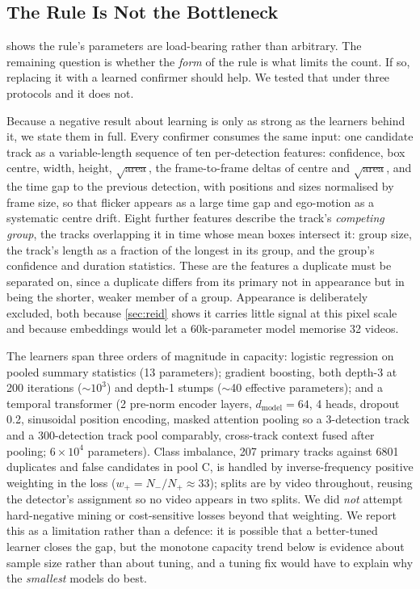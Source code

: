 \subsection{The Rule Is Not the Bottleneck}
\label{sec:learned}

 shows the rule's parameters are load-bearing rather than arbitrary.
The remaining question is whether the \emph{form} of the rule is what limits the count. If
so, replacing it with a learned confirmer should help. We tested that under three protocols
and it does not.

Because a negative result about learning is only as strong as the learners behind it, we
state them in full. Every confirmer consumes the same input: one candidate track as a
variable-length sequence of ten per-detection features: confidence, box centre, width, height, $\sqrt{\text{area}}$, the frame-to-frame deltas of centre and $\sqrt{\text{area}}$,
and the time gap to the previous detection, with positions and sizes normalised by frame
size, so that flicker appears as a large time gap and ego-motion as a systematic centre
drift. Eight further features describe the track's \emph{competing group}, the tracks
overlapping it in time whose mean boxes intersect it: group size, the track's length as a
fraction of the longest in its group, and the group's confidence and duration statistics.
These are the features a duplicate must be separated on, since a duplicate differs from its
primary not in appearance but in being the shorter, weaker member of a group. Appearance is
deliberately excluded, both because \cref{sec:reid} shows it carries little signal at this
pixel scale and because embeddings would let a 60k-parameter model memorise 32 videos.

The learners span three orders of magnitude in capacity: logistic regression on pooled
summary statistics (13 parameters); gradient boosting, both depth-3 at 200 iterations
($\sim$$10^3$) and depth-1 stumps ($\sim$40 effective parameters); and a temporal transformer
(2 pre-norm encoder layers, $d_{\text{model}}=64$, 4 heads, dropout 0.2, sinusoidal position
encoding, masked attention pooling so a 3-detection track and a 300-detection track pool
comparably, cross-track context fused after pooling; $6\times10^4$ parameters). Class
imbalance, 207 primary tracks against 6801 duplicates and false candidates in pool C, is
handled by inverse-frequency positive weighting in the loss
($w_+=N_-/N_+\approx33$); splits are by video throughout, reusing the detector's assignment so
no video appears in two splits. We did \emph{not} attempt hard-negative mining or
cost-sensitive losses beyond that weighting. We report this as a limitation rather than a
defence: it is possible that a better-tuned learner closes the gap, but the monotone capacity
trend below is evidence about sample size rather than about tuning, and a tuning fix would
have to explain why the \emph{smallest} models do best.

